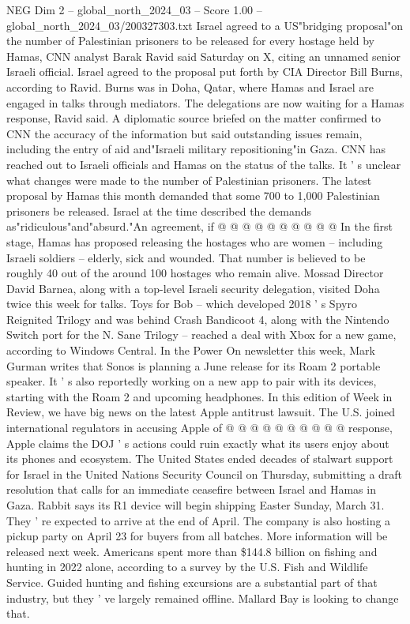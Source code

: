 \begin{textsample}{NEG Dim 2 – global\_north\_2024\_03 – Score 1.00 – global\_north\_2024\_03/200327303.txt}  \label{ex:f2_neg_082}
Israel agreed to a US"bridging proposal"on the number of Palestinian prisoners to be released for every hostage held by Hamas, CNN analyst Barak Ravid said Saturday on X, citing an unnamed senior Israeli official.
Israel agreed to the proposal put forth by CIA Director Bill Burns, according to Ravid.
Burns was in Doha, Qatar, where Hamas and Israel are engaged in talks through mediators.
The delegations are now waiting for a Hamas response, Ravid said.
A diplomatic source briefed on the matter confirmed to CNN the accuracy of the information but said outstanding issues remain, including the entry of aid and"Israeli military repositioning"in Gaza.
CNN has reached out to Israeli officials and Hamas on the status of the talks.
It ' s unclear what changes were made to the number of Palestinian prisoners.
The latest proposal by Hamas this month demanded that some 700 to 1,000 Palestinian prisoners be released.
Israel at the time described the demands as"ridiculous"and"absurd."An agreement, if @ @ @ @ @ @ @ @ @ @ In the first stage, Hamas has proposed releasing the hostages who are women -- including Israeli soldiers -- elderly, sick and wounded.
That number is believed to be roughly 40 out of the around 100 hostages who remain alive.
Mossad Director David Barnea, along with a top-level Israeli security delegation, visited Doha twice this week for talks.
Toys for Bob -- which developed 2018 ' s Spyro Reignited Trilogy and was behind Crash Bandicoot 4, along with the Nintendo Switch port for the N.
Sane Trilogy -- reached a deal with Xbox for a new game, according to Windows Central.
In the Power On newsletter this week, Mark Gurman writes that Sonos is planning a June release for its Roam 2 portable speaker.
It ' s also reportedly working on a new app to pair with its devices, starting with the Roam 2 and upcoming headphones.
In this edition of Week in Review, we have big news on the latest Apple antitrust lawsuit.
The U.S. joined international regulators in accusing Apple of @ @ @ @ @ @ @ @ @ @ response, Apple claims the DOJ ' s actions could ruin exactly what its users enjoy about its phones and ecosystem.
The United States ended decades of stalwart support for Israel in the United Nations Security Council on Thursday, submitting a draft resolution that calls for an immediate ceasefire between Israel and Hamas in Gaza.
Rabbit says its R1 device will begin shipping Easter Sunday, March 31.
They ' re expected to arrive at the end of April.
The company is also hosting a pickup party on April 23 for buyers from all batches.
More information will be released next week.
Americans spent more than \$144.8 billion on fishing and hunting in 2022 alone, according to a survey by the U.S.
Fish and Wildlife Service.
Guided hunting and fishing excursions are a substantial part of that industry, but they ' ve largely remained offline.
Mallard Bay is looking to change that.

\end{textsample}
